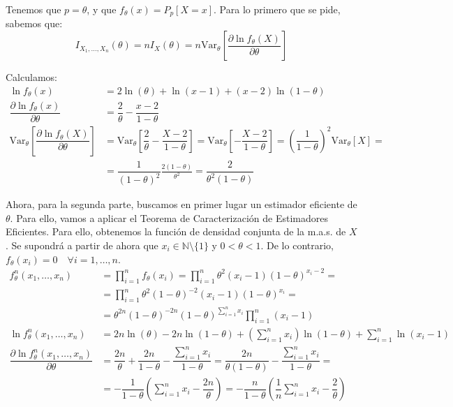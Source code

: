 \documentclass[12pt]{article}
\newcommand{\V}{\mathrm{Var}}
\newcommand{\N}{\mathbb{N}}
\begin{document}
\begin{ejercicio}[2.25 puntos]
\begin{enumerate}[label=\alph*)]
\begin{enumerate}[label=\alph*)]
                    Tenemos que $p = \theta$, y que $f_\theta(x) = P_p[X=x]$. Para lo primero que se pide, 
                    sabemos que:
                    $$I_{X_1, \ldots, X_n}(\theta) = n I_X(\theta) = n \V_\theta \left[ \dfrac{\partial \ln f_\theta(X)}{\partial \theta} \right]$$

                    Calculamos:
                    \begin{align*}
                        \ln f_\theta(x) &= 2 \ln(\theta) + \ln(x-1) + (x-2) \ln(1-\theta) \\
                        \dfrac{\partial \ln f_\theta(x)}{\partial \theta} &= \dfrac{2}{\theta} - \dfrac{x-2}{1-\theta}\\
                        \V_\theta \left[ \dfrac{\partial \ln f_\theta(X)}{\partial \theta} \right] &= \V_\theta \left[ \dfrac{2}{\theta} - \dfrac{X-2}{1-\theta} \right] =
                        \V_\theta \left[ - \dfrac{X-2}{1-\theta} \right] = \left( \dfrac{1}{1-\theta} \right)^2 \V_\theta[X] =\\&= \dfrac{1}{(1-\theta)^2} \frac{2(1-\theta)}{\theta^2} = \dfrac{2}{\theta^2(1-\theta)}
                    \end{align*}
                    

                    Ahora, para la segunda parte, buscamos en primer lugar un estimador eficiente de $\theta$. Para ello, vamos a aplicar el Teorema de Caracterización de Estimadores Eficientes. Para ello, obtenemos la función de densidad conjunta de la m.a.s. de $X$. Se supondrá a partir de ahora que $x_i \in \N \setminus \{1\}$ y $0<\theta<1$. De lo contrario, $f_\theta(x_i) = 0 \quad \forall i = 1, \ldots, n$.
                    \begin{align*}
                        f_\theta^n(x_1, \ldots, x_n) &= \prod_{i=1}^n f_\theta(x_i) = \prod_{i=1}^n \theta^2(x_i-1){(1-\theta)}^{x_i-2} =\\&= 
                        \prod_{i=1}^n \theta^2 (1-\theta)^{-2} (x_i-1) {(1-\theta)}^{x_i} =\\&= \theta^{2n} (1-\theta)^{-2n}(1-\theta)^{\sum\limits_{i=1}^{n} x_i} \prod_{i=1}^n (x_i-1)\\
                        \ln f_\theta^n(x_1, \ldots, x_n) &= 2n \ln(\theta) - 2n \ln(1-\theta) + \left(\sum_{i=1}^{n} x_i \right) \ln(1-\theta) + \sum_{i=1}^{n} \ln(x_i-1)\\
                        \dfrac{\partial \ln f_\theta^n(x_1, \ldots, x_n)}{\partial \theta}&= \dfrac{2n}{\theta} + \dfrac{2n}{1-\theta} - \dfrac{\displaystyle\sum_{i=1}^{n} x_i}{1-\theta} = \dfrac{2n}{\theta(1-\theta)} - \dfrac{\displaystyle\sum_{i=1}^{n} x_i}{1-\theta} =\\&= -\dfrac{1}{1-\theta} \left(\displaystyle\sum_{i=1}^{n} x_i - \dfrac{2n}{\theta} \right)
                        = -\dfrac{n}{1-\theta} \left(\dfrac{1}{n}\displaystyle\sum_{i=1}^{n} x_i - \dfrac{2}{\theta} \right)
                    \end{align*}


\end{enumerate}
\end{enumerate}
\end{ejercicio}
\end{document}
